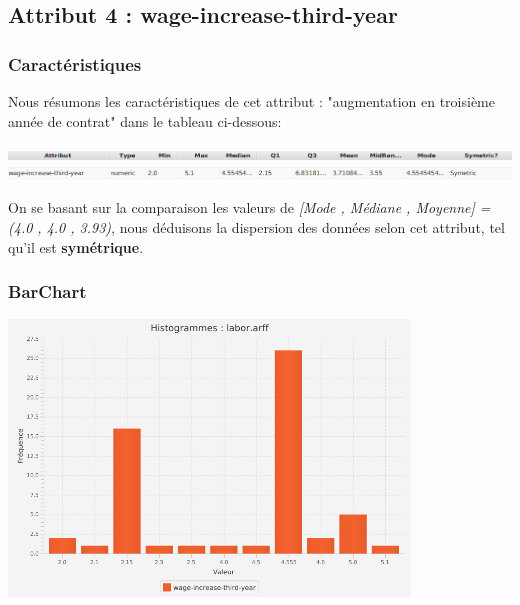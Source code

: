 \documentclass[12pt,a4paper,oneside]{book}
\begin{document}
\newpage


\subsection{Attribut 4 : wage-increase-third-year }
\subsubsection{Caractéristiques}
Nous résumons les caractéristiques de cet attribut : "augmentation en troisième année de contrat" dans le tableau ci-dessous:
\begin{center}
	\includegraphics[width=1\textwidth]{screens/att.png}\\ \includegraphics[width=1\textwidth]{screens/att-4.png}%
	\label{labelname}%
\end{center}

On se basant sur la comparaison les valeurs de \textit{[Mode , Médiane , Moyenne] = (4.0 , 4.0 , 3.93)}, nous déduisons la dispersion des données selon cet attribut, tel qu'il est \textbf{symétrique}.

\subsubsection{BarChart}

\begin{center}
	\includegraphics[width=0.8\textwidth]{screens/barchart/wage-increase-third-year-barchart.png}%
	\label{labelname}%
\end{center}
\end{document}
